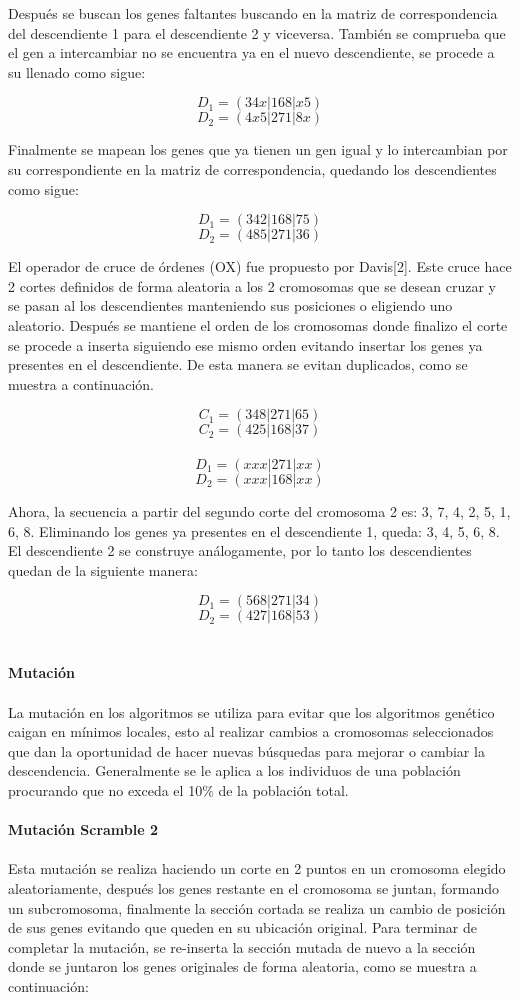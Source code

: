 \documentclass[10pt,letterpaper]{article}
\begin{document}
Después se buscan los genes faltantes buscando en la matriz de correspondencia del descendiente 1 para el descendiente 2 y viceversa. También se comprueba que el gen a intercambiar no se encuentra ya en el nuevo descendiente, se procede a su llenado como sigue:

\[D_1 = ( 3 4 x | 1 6 8 | x 5 )\]
\[D_2 = ( 4 x 5 | 2 7 1 | 8 x )\]

Finalmente se mapean los genes que ya tienen un gen igual y lo intercambian por su correspondiente en la matriz de correspondencia, quedando los descendientes como sigue:

\[D_1 = ( 342 | 1 6 8 | 75 )\]
\[D_2 = ( 485 | 2 7 1 | 36 )\]

El operador de cruce de órdenes (OX) fue propuesto por Davis[2]. Este cruce hace 2 cortes definidos de forma aleatoria a los 2 cromosomas que se desean cruzar y se pasan al los descendientes manteniendo sus posiciones o eligiendo uno aleatorio. Después se mantiene el orden de los cromosomas donde finalizo el corte se procede a inserta siguiendo ese mismo orden evitando insertar los genes ya presentes en el descendiente. De esta manera se evitan duplicados, como se muestra a continuación. 

\[C_1 = ( 3 4 8 | 2 7 1 | 6 5 )\]
\[C_2 = ( 4 2 5 | 1 6 8 | 3 7 )\]\\
\[D_1 = ( x x x | 2 7 1 | x x )\]
\[D_2 = ( x x x | 1 6 8 | x x )\]

Ahora, la secuencia a partir del segundo corte del cromosoma 2 es: 3, 7, 4, 2, 5, 1, 6, 8. Eliminando los genes ya presentes en el descendiente 1, queda: 3, 4, 5, 6, 8. El descendiente 2 se construye análogamente, por lo tanto los descendientes quedan de la siguiente manera:

\[D_1 = ( 568 | 271 | 34 )\]
\[D_2 = ( 427 | 168 | 53 )\]
\\\\
\hrulefill \textbf{\large Mutación}
\\\\
La mutación en los algoritmos se utiliza para evitar que los algoritmos genético caigan en mínimos locales, esto al realizar cambios a cromosomas seleccionados que dan la oportunidad de hacer nuevas búsquedas para mejorar o cambiar la descendencia. Generalmente se le aplica a los individuos de una población procurando que no exceda el 10\% de la población total.
\\\\
\textbf{\large Mutación Scramble 2}
\\\\
Esta mutación se realiza haciendo un corte en 2 puntos en un  cromosoma elegido aleatoriamente, después los genes restante en el cromosoma se juntan, formando un subcromosoma, finalmente la sección cortada se realiza un cambio de posición de sus genes evitando que queden en su ubicación original. Para terminar de completar la mutación, se re-inserta la sección mutada de nuevo a la sección donde se juntaron los genes originales de forma aleatoria, como se muestra a continuación:
\end{document}
